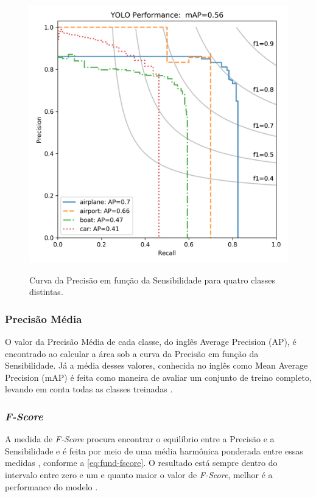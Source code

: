\begin{figure}[h!] %
  \centering
  \caption{Curva da Precisão em função da Sensibilidade para quatro classes distintas.}
  \includegraphics[scale=0.6]{img/img-fundamentacao-prcurve.png}
  \label{fig:fund-prcurve}
\end{figure}

\subsubsection{Precisão Média} \label{cap:fund-ia-metricas-pmed}
O valor da Precisão Média de cada classe, do inglês Average Precision (AP), é encontrado ao calcular a área sob a curva da Precisão em função da Sensibilidade. Já a média desses valores, conhecida no inglês como Mean Average Precision (mAP) é feita como maneira de avaliar um conjunto de treino completo, levando em conta todas as classes treinadas \cite{ref:Tan}.

\subsubsection{\textit{F-Score}} \label{cap:fund-ia-metricas-fscore}
A medida de \textit{F-Score} procura encontrar o equilíbrio entre a Precisão e a Sensibilidade \cite{ref:Mishra} e é feita por meio de uma média harmônica ponderada entre essas medidas \cite{ref:Batarseh-Yang}, conforme a \autoref{eq:fund-fscore}. O resultado está sempre dentro do intervalo entre zero e um e quanto maior o valor de \textit{F-Score}, melhor é a performance do modelo \cite{ref:Mishra}.

